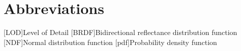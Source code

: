 \chapter*{Abbreviations}
\begin{acronym}[BRDF]
[LOD]{Level of Detail}
[BRDF]{Bidirectional reflectance distribution function}
[NDF]{Normal distribution function}
[pdf]{Probability density function}
\end{acronym}